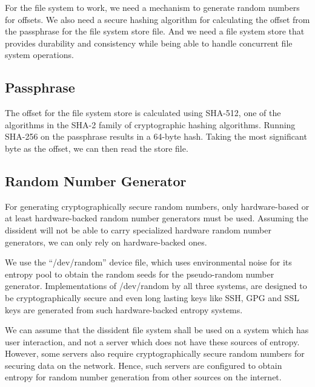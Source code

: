 \documentclass[10pt,twocolumn]{article}
\begin{document}
For the file system to work, we need a mechanism to generate random numbers for offsets. We also need a secure hashing algorithm for calculating the offset from the passphrase for the file system store file. And we need a file system store that provides durability and consistency while being able to handle concurrent file system operations. 

\subsection{Passphrase}

The offset for the file system store is calculated using SHA-512, one of the algorithms in the SHA-2 family of cryptographic hashing algorithms. Running SHA-256 on the passphrase results in a 64-byte hash. Taking the most significant byte as the offset, we can then read the store file. 

\subsection{Random Number Generator}

For generating cryptographically secure random numbers, only hardware-based or at least hardware-backed random number generators must be used. Assuming the dissident will not be able to carry specialized hardware random number generators, we can only rely on hardware-backed ones. 

We use the ``/dev/random'' device file, which uses environmental noise for its entropy pool to obtain the random seeds for the pseudo-random number generator. Implementations of /dev/random by all three systems, are designed to be cryptographically secure and even long lasting keys like SSH, GPG and SSL keys are generated from such hardware-backed entropy systems. 

We can assume that the dissident file system shall be used on a system which has user interaction, and not a server which does not have these sources of entropy. However, some servers also require cryptographically secure random numbers for securing data on the network. Hence, such servers are configured to obtain entropy for random number generation from other sources on the internet. 
\end{document}
